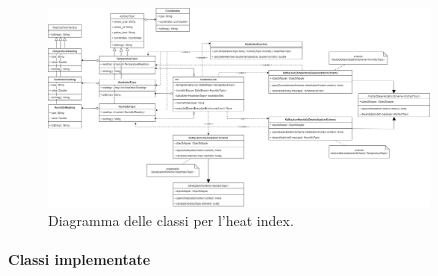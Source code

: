 \documentclass[8pt]{article}
\newcommand{\subsubsubsection}[1]{\paragraph{#1}\mbox{}\\\\}
\begin{document}
\begin{figure}[h!]
    \centering
    \includegraphics[width=0.9\textwidth]{images_st/heatindexjob.png}
    \caption{Diagramma delle classi per l'heat index.}
    \label{fig:Diagramma delle classi per l'heat index}
\end{figure}
\subsubsubsection{Classi implementate}
\end{document}
